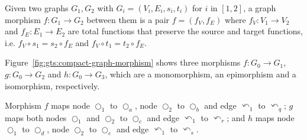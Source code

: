 \begin{definition}\label{def:graph-morphism} Given two graphs $G_1,G_2$ with \mbox{$G_i = \left(V_i, E_i, s_i, t_i\right)$} for $i$ in $[1,2]$, a graph morphism $f : G_1 \rightarrow G_2$ between them is a pair $f = \left(f_V,f_E\right)$ where $f_V : V_1 \rightarrow V_2$ and $f_E : E_1 \rightarrow E_2$ are total functions that preserve the source and target functions, i.e. $f_V \circ s_1 = s_2 \circ f_E$ and $f_V \circ t_1 = t_2 \circ f_E$.
\end{definition}

\begin{example}Figure~\ref{fig:gts:compact-graph-morphism} shows three morphisms $f : G_0 \rightarrow G_1$, $g : G_0 \rightarrow G_2$ and $h : G_0 \rightarrow G_3$, which are a monomorphism, an epimorphism and a isomorphism, respectively.

  Morphism $f$ maps node $\Circle_1$ to $\Circle_a$, node $\Circle_2$ to $\Circle_b$ and edge $\curvearrowleft_1$ to $\curvearrowleft_q$; $g$ maps both nodes $\Circle_1$ and $\Circle_2$ to $\Circle_c$ and edge $\curvearrowleft_1$ to $\curvearrowleft_r$; and $h$ maps node $\Circle_1$ to $\Circle_d$, node $\Circle_2$ to $\Circle_e$ and edge $\curvearrowleft_1$ to $\curvearrowleft_s$.


\end{example}
